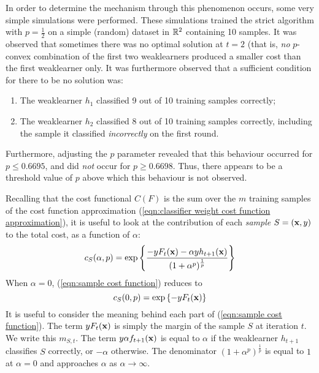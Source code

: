 In order to determine the mechanism through this phenomenon occurs,
some very simple simulations were performed.  These simulations
trained the strict algorithm with $p = \frac{1}{2}$ on a simple
(random) dataset in $\mathbb{R}^2$ containing 10 samples.  It was observed
that sometimes there was no optimal solution at $t=2$ (that is, 
\emph{no} $p$-convex combination of the first two weaklearners produced a
smaller cost than the first weaklearner only.  It was furthermore
observed that a sufficient condition for there to be no solution was:
%
\begin{enumerate}
\item	The weaklearner $h_1$ classified 9 out of 10 training samples
	correctly; 
\item	The weaklearner $h_2$ classified 8 out of 10 training samples
	correctly, including the sample it classified
	\emph{incorrectly} on the first round.
\end{enumerate}
%
Furthermore, adjusting the $p$ parameter revealed that this behaviour
occurred for $p \leq 0.6695$, and did \emph{not} occur for $p \geq
0.6698$.  Thus, there appears to be a threshold value of $p$ above
which this behaviour is not observed.

Recalling that the cost functional $C(F)$ is the sum over the $m$
training samples of the cost function approximation
(\ref{eqn:classifier weight cost function approximation}), it is
useful to look at the contribution of each \emph{sample} $S = (\mathbf{x},
y)$ to the total cost, as a function of $\alpha$:
%
\begin{equation}
\label{eqn:sample cost function}
c_S(\alpha, p) = \exp \left\{ \frac{-y F_t(\mathbf{x}) - \alpha y h_{t+1}
(\mathbf{x})}{(1 + \alpha^p)^{\frac{1}{p}}} \right\}
\end{equation}
%
When $\alpha = 0$, (\ref{eqn:sample cost function}) reduces to
%
\begin{equation}
c_S(0, p) = \exp \left\{ -y F_t(\mathbf{x}) \right\}
\end{equation}
%
It is useful to consider the meaning behind each part of
(\ref{eqn:sample cost function}).  The term $y F_t(\mathbf{x})$ is simply
the margin of the sample $S$ at iteration $t$.  We write this $m_{S,
t}$.  The term $y \alpha f_{t+1}(\mathbf{x})$ is equal to $\alpha$ if the
weaklearner $h_{t+1}$ classifies $S$ correctly, or $-\alpha$
otherwise.  The denominator $(1 + \alpha^p)^{\frac{1}{p}}$ is equal to
$1$ at $\alpha=0$ and approaches $\alpha$ as $\alpha \rightarrow
\infty$.

